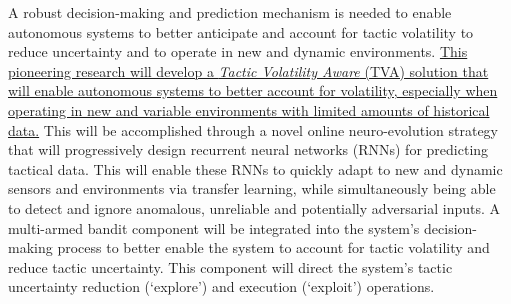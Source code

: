 












A robust decision-making and prediction mechanism is needed to enable autonomous systems to better anticipate and account for tactic volatility to reduce uncertainty and to operate in new and dynamic environments. \ul{This pioneering research will develop a \emph{Tactic Volatility Aware} (TVA) solution that will enable autonomous systems to better account for volatility, especially when operating in new and variable environments with limited amounts of historical data.} This will be accomplished through a novel online neuro-evolution strategy that will progressively design recurrent neural networks (RNNs) for predicting tactical data. This will enable these RNNs to quickly adapt to new and dynamic sensors and environments via transfer learning, while simultaneously being able to detect and ignore anomalous, unreliable and potentially adversarial inputs. A multi-armed bandit component will be integrated into the system's decision-making process to better enable the system to account for tactic volatility and reduce tactic uncertainty. This component will direct the system's tactic uncertainty reduction (`explore') and execution (`exploit') operations.

